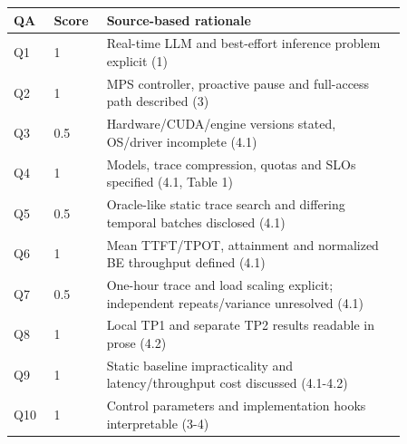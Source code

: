 \begin{longtable}{P{0.09\linewidth}P{0.10\linewidth}P{0.67\linewidth}}
\toprule QA & Score & Source-based rationale\\\midrule\endhead
Q1 & 1 & Real-time LLM and best-effort inference problem explicit (1)\\
Q2 & 1 & MPS controller, proactive pause and full-access path described (3)\\
Q3 & 0.5 & Hardware/CUDA/engine versions stated, OS/driver incomplete (4.1)\\
Q4 & 1 & Models, trace compression, quotas and SLOs specified (4.1, Table 1)\\
Q5 & 0.5 & Oracle-like static trace search and differing temporal batches disclosed (4.1)\\
Q6 & 1 & Mean TTFT/TPOT, attainment and normalized BE throughput defined (4.1)\\
Q7 & 0.5 & One-hour trace and load scaling explicit; independent repeats/variance unresolved (4.1)\\
Q8 & 1 & Local TP1 and separate TP2 results readable in prose (4.2)\\
Q9 & 1 & Static baseline impracticality and latency/throughput cost discussed (4.1-4.2)\\
Q10 & 1 & Control parameters and implementation hooks interpretable (3-4)\\
\bottomrule\end{longtable}

